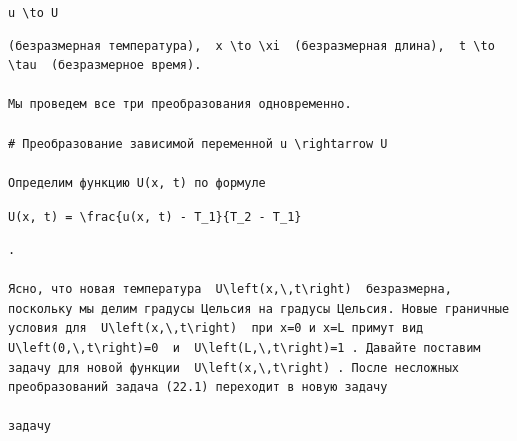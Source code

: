 \documentclass[
  ukrainian,
]{article}
\begin{document}
\texttt{u\ \textbackslash{}to\ U}

\begin{verbatim}
(безразмерная температура),  x \to \xi  (безразмерная длина),  t \to \tau  (безразмерное время).

Мы проведем все три преобразования одновременно.

# Преобразование зависимой переменной u \rightarrow U

Определим функцию U(x, t) по формуле
\end{verbatim}

\texttt{U(x,\ t)\ =\ \textbackslash{}frac\{u(x,\ t)\ -\ T\_1\}\{T\_2\ -\ T\_1\}}

\begin{verbatim}
.

Ясно, что новая температура  U\left(x,\,t\right)  безразмерна, поскольку мы делим градусы Цельсия на градусы Цельсия. Новые граничные условия для  U\left(x,\,t\right)  при x=0 и x=L примут вид  U\left(0,\,t\right)=0  и  U\left(L,\,t\right)=1 . Давайте поставим задачу для новой функции  U\left(x,\,t\right) . После несложных преобразований задача (22.1) переходит в новую задачу

задачу
\end{verbatim}
\end{document}
